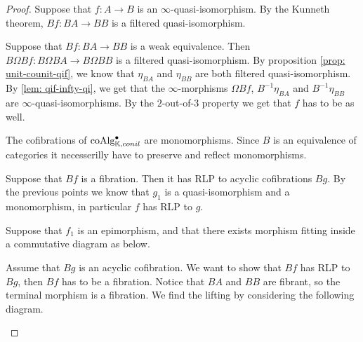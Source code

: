 \documentclass[../thesis.tex]{subfiles}
\begin{document}
        \begin{proof}
            Suppose that $f: A \rightarrow B$ is an $\infty$-quasi-isomorphism. By the Kunneth theorem, $Bf : BA \rightarrow BB$ is a filtered quasi-isomorphism.

            Suppose that $Bf : BA \rightarrow BB$ is a weak equivalence. Then $B\Omega Bf : B\Omega BA \rightarrow B\Omega BB$ is a filtered quasi-isomorphism. By proposition \ref{prop: unit-counit-qif}, we know that $\eta_{BA}$ and $\eta_{BB}$ are both filtered quasi-isomorphism. By \ref{lem: qif-infty-qi}, we get that the $\infty$-morphisms $\Omega Bf$, $B^{-1}\eta_{BA}$ and $B^{-1}\eta_{BB}$ are $\infty$-quasi-isomorphisms. By the $2$-out-of-$3$ property we get that $f$ has to be as well.

            The cofibrations of $\tt{coAlg}_{\mathbb{K},conil}^\bullet$ are monomorphisms. Since $B$ is an equivalence of categories it necesserilly have to preserve and reflect monomorphisms. 

            Suppose that $Bf$ is a fibration. Then it has RLP to acyclic cofibrations $Bg$. By the previous points we know that $g_1$ is a quasi-isomorphism and a monomorphism, in particular $f$ has RLP to $g$.

            Suppose that $f_1$ is an epimorphism, and that there exists morphism fitting inside a commutative diagram as below.
            \begin{center}
            \end{center}
            Assume that $Bg$ is an acyclic cofibration. We want to show that $Bf$ has RLP to $Bg$, then $Bf$ has to be a fibration. Notice that $BA$ and $BB$ are fibrant, so the terminal morphism is a fibration. We find the lifting by considering the following diagram.
            \begin{center}
            \end{center}

        \end{proof}
\end{document}
